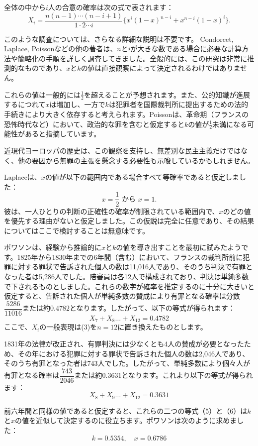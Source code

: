\documentclass[a4paper,11pt,openany]{ltjsbook}
\begin{document}
全体の中から$i$人の合意の確率は次の式で表されます：
\[
X_i = \frac{n(n-1)\cdots (n-i+1)}{1 \cdot 2 \cdots i} \{x^i(1-x)^{n-i} + x^{n-i}(1-x)^i\}.
\]

このような調査については、さらなる詳細な説明は不要です。 Condorcet, Laplace, Poissonなどの他の著者は、$n$と$i$が大きな数である場合に必要な計算方法や簡略化の手順を詳しく調査してきました。全般的には、この研究は非常に推測的なものであり、$x$と$k$の値は直接観察によって決定されるわけではありません。

これらの値は一般的には$\frac{1}{2}$を超えることが予想されます。また、公的知識が進展するにつれて$x$は増加し、一方で$k$は犯罪者を国際裁判所に提出するための法的手続きにより大きく依存すると考えられます。Poissonは、革命期（フランスの恐怖時代など）において、政治的な罪を含むと仮定すると$k$の値が$\frac{1}{2}$未満になる可能性があると指摘しています。

近現代ヨーロッパの歴史は、この観察を支持し、無差別な民主主義だけではなく、他の要因から無罪の主張を懸念する必要性も示唆しているかもしれません。

Laplaceは、$x$の値が以下の範囲内である場合すべて等確率であると仮定しました：
\[
x = \frac{1}{2} \text{ から } x = 1.
\]
彼は、一人ひとりの判断の正確性の確率が制限されている範囲内で、$x$のどの値を優先する理由がないと仮定しました。この仮説は完全に任意であり、その結果についてはここで検討することは無意味です。

ポワソンは、経験から推論的に$x$と$k$の値を導き出すことを最初に試みたようです。1825年から1830年までの6年間（含む）において、フランスの裁判所前に犯罪に対する罪状で告訴された個人の数は11,016人であり、そのうち判決で有罪となった者は5,286人でした。陪審員は各12人で構成されており、判決は単純多数で下されるものとしました。これらの数字が確率を推定するのに十分に大きいと仮定すると、告訴された個人が単純多数の賛成により有罪となる確率は分数$\dfrac{5286}{11016}$または約$0.4782$となります。したがって、以下の等式が得られます：
\[
X_7 + X_8 \dotsc + X_{12} = 0.4782 \tag{5}
\]
ここで、$X_i$の一般表現は(3)を$n=12$に置き換えたものとします。

1831年の法律が改正され、有罪判決には少なくとも4人の賛成が必要となったため、その年における犯罪に対する罪状で告訴された個人の数は2,046人であり、そのうち有罪となった者は743人でした。したがって、単純多数により個々人が有罪となる確率は$\dfrac{743}{2046}$または約$0.3631$となります。これより以下の等式が得られます：
\[
X_8 + X_9 \dotsc + X_{12} = 0.3631 \tag{6}
\]

前六年間と同様の値であると仮定すると、これらの二つの等式（5）と（6）は$k$と$x$の値を近似して決定するのに役立ちます。ポワソンは次のように求めました：
\[
k = 0.5354, \quad x = 0.6786
\]
\end{document}
